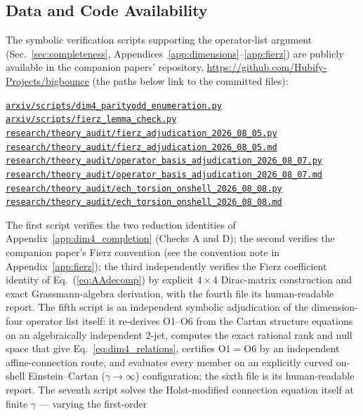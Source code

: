 \documentclass[aps,prd,twocolumn,superscriptaddress,showpacs,preprintnumbers,nofootinbib,longbibliography,floatfix]{revtex4-2}
\newcommand{\repoBase}{https://github.com/Hubify-Projects/bigbounce/blob/main}
\providecommand{\artifact}[1]{\href{\repoBase/#1}{\nolinkurl{#1}}}
\begin{document}
\subsection*{Data and Code Availability}
The symbolic verification scripts supporting the
operator-list argument (Sec.~\ref{sec:completeness},
Appendices~\ref{app:dimensions}--\ref{app:fierz}) are publicly available
in the companion papers' repository,
\url{https://github.com/Hubify-Projects/bigbounce} (the paths below link
to the committed files):
\begin{center}\footnotesize
\artifact{arxiv/scripts/dim4_parityodd_enumeration.py} \\
\artifact{arxiv/scripts/fierz_lemma_check.py} \\
\mbox{\artifact{research/theory_audit/fierz_adjudication_2026_08_05.py}} \\
\mbox{\artifact{research/theory_audit/fierz_adjudication_2026_08_05.md}} \\
{\scriptsize\mbox{\artifact{research/theory_audit/operator_basis_adjudication_2026_08_07.py}}} \\
{\scriptsize\mbox{\artifact{research/theory_audit/operator_basis_adjudication_2026_08_07.md}}} \\
{\scriptsize\mbox{\artifact{research/theory_audit/ech_torsion_onshell_2026_08_08.py}}} \\
{\scriptsize\mbox{\artifact{research/theory_audit/ech_torsion_onshell_2026_08_08.md}}}
\end{center}
The first script verifies the two reduction identities of
Appendix~\ref{app:dim4_completion} (Checks A and D); the second verifies
the companion paper's Fierz convention (see the convention note in
Appendix~\ref{app:fierz}); the third independently verifies the Fierz
coefficient identity of Eq.~(\ref{eq:AAdecomp}) by explicit $4\times4$
Dirac-matrix construction and exact Grassmann-algebra derivation, with
the fourth file its human-readable report. The fifth script is an
independent symbolic adjudication of the dimension-four operator list
itself: it re-derives O1--O6 from the Cartan structure equations on an
algebraically independent $2$-jet, computes the exact rational rank and
null space that give Eq.~\eqref{eq:dim4_relations}, certifies
$\mathrm{O1}=\mathrm{O6}$ by an independent affine-connection route, and
evaluates every member on an explicitly curved on-shell
Einstein--Cartan ($\gamma\to\infty$) configuration; the sixth file is its
human-readable report. The seventh script solves the Holst-modified
connection equation itself at finite $\gamma$ --- varying the first-order
\end{document}
